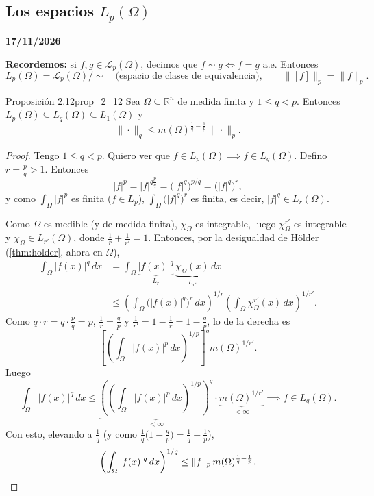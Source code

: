 \subsection{Los espacios \texorpdfstring{$L_p(\Omega)$}{Lp(Omega)}}

\textbf{17/11/2026}


\textbf{Recordemos:} si $f, g \in \mathcal{L}_p(\Omega)$, decimos que $f \sim g \iff f = g$ a.e. Entonces
\[
L_p(\Omega) = \mathcal{L}_p(\Omega)/\!\sim \quad \text{(espacio de clases de equivalencia)}, \qquad \big\|[f]\big\|_p = \|f\|_p.
\]

\begin{proposicion}{Proposición 2.12}{prop_2_12}
Sea $\Omega \subseteq \mathbb{R}^n$ de medida finita y $1 \le q < p$. Entonces $L_p(\Omega) \subseteq L_q(\Omega) \subseteq L_1(\Omega)$ y
\[
\|\cdot\|_q \le m(\Omega)^{\frac{1}{q} - \frac{1}{p}}\,\|\cdot\|_p.
\]
\end{proposicion}

\begin{proof}
Tengo $1 \le q < p$. Quiero ver que $f \in L_p(\Omega) \implies f \in L_q(\Omega)$. Defino $r = \frac{p}{q} > 1$. Entonces
\[
|f|^p = |f|^{q\frac{p}{q}} = \big(|f|^q\big)^{p/q} = \big(|f|^q\big)^r,
\]
y como $\int_\Omega|f|^p$ es finita ($f \in L_p$), $\int_\Omega\big(|f|^q\big)^r$ es finita, es decir, $|f|^q \in L_r(\Omega)$.

Como $\Omega$ es medible (y de medida finita), $\chi_\Omega$ es integrable, luego $\chi_\Omega^{r'}$ es integrable y $\chi_\Omega \in L_{r'}(\Omega)$, donde $\frac{1}{r} + \frac{1}{r'} = 1$. Entonces, por la desigualdad de Hölder (\cref{thm:holder}, ahora en $\Omega$),
\begin{align*}
\int_\Omega|f(x)|^q\,dx &= \int_\Omega\underbrace{|f(x)|^q}_{L_r}\,\underbrace{\chi_\Omega(x)}_{L_{r'}}\,dx \\
&\le \left(\int_\Omega\big(|f(x)|^q\big)^r\,dx\right)^{1/r}\left(\int_\Omega\chi_\Omega^{r'}(x)\,dx\right)^{1/r'}.
\end{align*}
Como $q\cdot r = q\cdot\frac{p}{q} = p$, $\frac{1}{r} = \frac{q}{p}$ y $\frac{1}{r'} = 1 - \frac{1}{r} = 1 - \frac{q}{p}$, lo de la derecha es
\[
\left[\left(\int_\Omega|f(x)|^p\,dx\right)^{1/p}\right]^q m(\Omega)^{1/r'}.
\]
Luego
\[
\int_\Omega|f(x)|^q\,dx \le \underbrace{\left(\left(\int_\Omega|f(x)|^p\,dx\right)^{1/p}\right)^q}_{<\infty}\cdot\underbrace{m(\Omega)^{1/r'}}_{<\infty} \implies f \in L_q(\Omega).
\]
Con esto, elevando a $\frac{1}{q}$ (y como $\frac{1}{q}\big(1 - \frac{q}{p}\big) = \frac{1}{q} - \frac{1}{p}$),
\[
\left(\int_\Omega|f(x)|^q\,dx\right)^{1/q} \le \|f\|_p\, m(\Omega)^{\frac{1}{q} - \frac{1}{p}}. \qedhere
\]
\end{proof}

